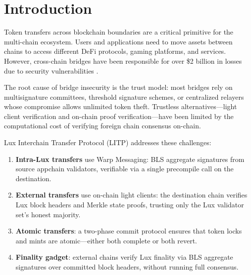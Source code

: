 \section{Introduction}


Token transfers across blockchain boundaries are a critical primitive for the multi-chain ecosystem. Users and applications need to move assets between chains to access different DeFi protocols, gaming platforms, and services. However, cross-chain bridges have been responsible for over \$2 billion in losses due to security vulnerabilities \cite{zamyatin2021bridge, ronin2022, wormhole2022}.

The root cause of bridge insecurity is the trust model: most bridges rely on multisignature committees, threshold signature schemes, or centralized relayers whose compromise allows unlimited token theft. Trustless alternatives---light client verification and on-chain proof verification---have been limited by the computational cost of verifying foreign chain consensus on-chain.

Lux Interchain Transfer Protocol (LITP) addresses these challenges:

\begin{enumerate}[label=(\roman*)]
    \item \textbf{Intra-Lux transfers} use Warp Messaging: BLS aggregate signatures from source appchain validators, verifiable via a single precompile call on the destination.
    \item \textbf{External transfers} use on-chain light clients: the destination chain verifies Lux block headers and Merkle state proofs, trusting only the Lux validator set's honest majority.
    \item \textbf{Atomic transfers}: a two-phase commit protocol ensures that token locks and mints are atomic---either both complete or both revert.
    \item \textbf{Finality gadget}: external chains verify Lux finality via BLS aggregate signatures over committed block headers, without running full consensus.
\end{enumerate}

